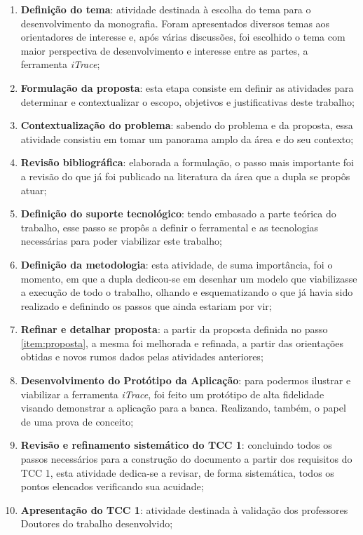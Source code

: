 \begin{enumerate}
    \item \textbf{Definição do tema}: atividade destinada à escolha do tema para o desenvolvimento da monografia. Foram apresentados diversos temas aos orientadores de interesse e, após várias discussões, foi escolhido o tema com maior perspectiva de desenvolvimento e interesse entre as partes, a ferramenta \textit{iTrace};
    \item \label{item:proposta} \textbf{Formulação da proposta}: esta etapa consiste em definir as atividades para determinar e contextualizar o escopo, objetivos e justificativas deste trabalho;
    \item \textbf{Contextualização do problema}: sabendo do problema e da proposta, essa atividade consistiu em tomar um panorama amplo da área e do seu contexto;
    \item \textbf{Revisão bibliográfica}: elaborada a formulação, o passo mais importante foi a revisão do que já foi publicado na literatura da área que a dupla se propôs atuar;
    \item \textbf{Definição do suporte tecnológico}: tendo embasado a parte teórica do trabalho, esse passo se propôs a definir o ferramental e as tecnologias necessárias para poder viabilizar este trabalho;
    \item \textbf{Definição da metodologia}: esta atividade, de suma importância, foi o momento, em que a dupla dedicou-se em desenhar um modelo que viabilizasse a execução de todo o trabalho, olhando e esquematizando o que já havia sido realizado e definindo os passos que ainda estariam por vir;
    \item \textbf{Refinar e detalhar proposta}: a partir da proposta definida no passo \ref{item:proposta}, a mesma foi melhorada e refinada, a partir das orientações obtidas e novos rumos dados pelas atividades anteriores;
    \item \textbf{Desenvolvimento do Protótipo da Aplicação}: para podermos ilustrar e viabilizar a ferramenta \textit{iTrace}, foi feito um protótipo de alta fidelidade visando demonstrar a aplicação para a banca. Realizando, também, o papel de uma prova de conceito;
    \item \textbf{Revisão e refinamento sistemático do TCC 1}: concluindo todos os passos necessários para a construção do documento a partir dos requisitos do TCC 1, esta atividade dedica-se a revisar, de forma sistemática, todos os pontos elencados verificando sua acuidade;
    \item \label{item:revision} \textbf{Apresentação do TCC 1}: atividade destinada à validação dos professores Doutores do trabalho desenvolvido;

\end{enumerate}
